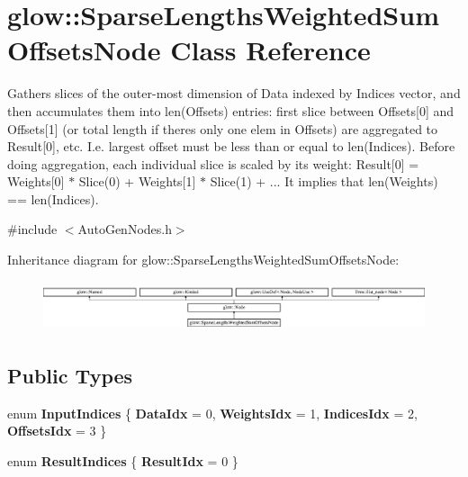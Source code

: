 \hypertarget{classglow_1_1_sparse_lengths_weighted_sum_offsets_node}{}\section{glow\+:\+:Sparse\+Lengths\+Weighted\+Sum\+Offsets\+Node Class Reference}
\label{classglow_1_1_sparse_lengths_weighted_sum_offsets_node}


Gathers slices of the outer-\/most dimension of Data indexed by Indices vector, and then accumulates them into len(\+Offsets) entries\+: first slice between Offsets\mbox{[}0\mbox{]} and Offsets\mbox{[}1\mbox{]} (or total length if there\textquotesingle{}s only one elem in Offsets) are aggregated to Result\mbox{[}0\mbox{]}, etc. I.\+e. largest offset must be less than or equal to len(\+Indices). Before doing aggregation, each individual slice is scaled by its weight\+: Result\mbox{[}0\mbox{]} = Weights\mbox{[}0\mbox{]} $\ast$ Slice(0) + Weights\mbox{[}1\mbox{]} $\ast$ Slice(1) + ... It implies that len(\+Weights) == len(\+Indices).  




{\ttfamily \#include $<$Auto\+Gen\+Nodes.\+h$>$}

Inheritance diagram for glow\+:\+:Sparse\+Lengths\+Weighted\+Sum\+Offsets\+Node\+:\begin{figure}[H]
\begin{center}
\leavevmode
\includegraphics[height=1.489362cm]{classglow_1_1_sparse_lengths_weighted_sum_offsets_node}
\end{center}
\end{figure}
\subsection*{Public Types}
\begin{DoxyCompactItemize}
\item 
\mbox{\label{classglow_1_1_sparse_lengths_weighted_sum_offsets_node_a15aa0ad0c34f636653a8fd9a0ec8d6e4}} 
enum {\bfseries Input\+Indices} \{ {\bfseries Data\+Idx} = 0, 
{\bfseries Weights\+Idx} = 1, 
{\bfseries Indices\+Idx} = 2, 
{\bfseries Offsets\+Idx} = 3
 \}
\item 
\mbox{\label{classglow_1_1_sparse_lengths_weighted_sum_offsets_node_a7e00ceef908495805b4dbd07bf7b1d94}} 
enum {\bfseries Result\+Indices} \{ {\bfseries Result\+Idx} = 0
 \}
\end{DoxyCompactItemize}
